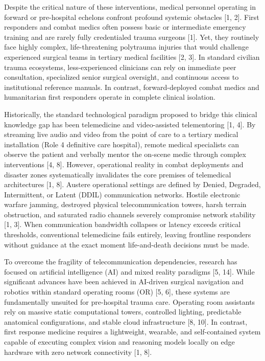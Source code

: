 \documentclass[12pt,a4paper]{report}
\begin{document}
Despite the critical nature of these interventions, medical personnel operating in forward or pre-hospital echelons confront profound systemic obstacles [1, 2]. First responders and combat medics often possess basic or intermediate emergency training and are rarely fully credentialed trauma surgeons [1]. Yet, they routinely face highly complex, life-threatening polytrauma injuries that would challenge experienced surgical teams in tertiary medical facilities [2, 3]. In standard civilian trauma ecosystems, less-experienced clinicians can rely on immediate peer consultation, specialized senior surgical oversight, and continuous access to institutional reference manuals. In contrast, forward-deployed combat medics and humanitarian first responders operate in complete clinical isolation.

Historically, the standard technological paradigm proposed to bridge this clinical knowledge gap has been telemedicine and video-assisted telementoring [1, 4]. By streaming live audio and video from the point of care to a tertiary medical installation (Role 4 definitive care hospital), remote medical specialists can observe the patient and verbally mentor the on-scene medic through complex interventions [4, 8]. However, operational reality in combat deployments and disaster zones systematically invalidates the core premises of telemedical architectures [1, 8]. Austere operational settings are defined by Denied, Degraded, Intermittent, or Latent (DDIL) communication networks. Hostile electronic warfare jamming, destroyed physical telecommunication towers, harsh terrain obstruction, and saturated radio channels severely compromise network stability [1, 3]. When communication bandwidth collapses or latency exceeds critical thresholds, conventional telemedicine fails entirely, leaving frontline responders without guidance at the exact moment life-and-death decisions must be made.

To overcome the fragility of telecommunication dependencies, research has focused on artificial intelligence (AI) and mixed reality paradigms [5, 14]. While significant advances have been achieved in AI-driven surgical navigation and robotics within standard operating rooms (OR) [5, 6], these systems are fundamentally unsuited for pre-hospital trauma care. Operating room assistants rely on massive static computational towers, controlled lighting, predictable anatomical configurations, and stable cloud infrastructure [8, 10]. In contrast, first response medicine requires a lightweight, wearable, and self-contained system capable of executing complex vision and reasoning models locally on edge hardware with zero network connectivity [1, 8].
\end{document}
